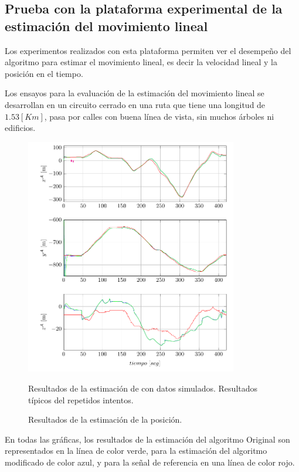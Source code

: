 \documentclass[conference]{IEEEtran}
\begin{document}
\subsection{Prueba con la plataforma experimental de la estimación del movimiento lineal}
Los experimentos realizados con esta plataforma permiten ver el desempeño del algoritmo para estimar el movimiento lineal, es decir la velocidad lineal y la posición en el tiempo. \par
Los ensayos para la evaluación de la estimación del movimiento lineal se desarrollan en un circuito cerrado en una ruta que tiene una longitud de $1.53[Km]$, pasa por calles con buena línea de vista, sin muchos árboles ni edificios.
\begin{figure}
\begin{center}
\includegraphics[width=25em]
{PlotPosition1.pdf}
\caption{Resultados de la estimación de la posición.}
\scriptsize{Resultados de la estimación de con datos simulados. Resultados típicos del repetidos intentos.}
\label{PlotX1}
\end{center}
\end{figure}
En todas las gráficas, los resultados de la estimación del algoritmo Original son representados en la línea de color verde, para la estimación del algoritmo modificado de color azul, y para la señal de referencia en una línea de color rojo.
\end{document}
